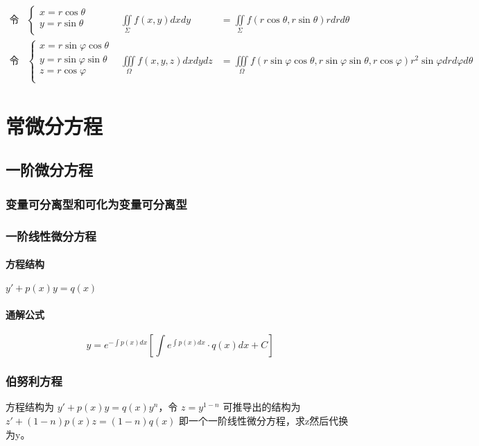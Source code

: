 ﻿\documentclass[a4paper,12pt,UTF8]{ctexart}
\begin{document}
    \begin{align*}
        \text{令}&
        \begin{cases}
            x=r \cos \theta\\
            y=r \sin \theta\\
        \end{cases}&
        \iint \limits_{\Sigma } f(x,y)dxdy& = \iint \limits_{\Sigma } f(r \cos \theta,r \sin \theta) rdrd\theta&\\
        \text{令}&
        \begin{cases}
            x=r \sin \varphi \cos \theta \\
            y=r \sin \varphi \sin \theta \\
            z=r \cos \varphi \\
        \end{cases}&
        \iiint \limits_{\Omega} f(x,y,z)dxdydz& = \iiint \limits_{\Omega} f(r \sin \varphi \cos \theta,r \sin \varphi \sin \theta,r \cos \varphi )r^2 \sin \varphi dr d\varphi d\theta&
    \end{align*}

    \section{常微分方程}
    
    \subsection{一阶微分方程}

    \subsubsection{变量可分离型和可化为变量可分离型}

    \subsubsection{一阶线性微分方程}
    \paragraph{方程结构}\(y'+p(x)y=q(x)\)
    \paragraph{通解公式}
    \[y=e^{-\int p(x)dx}\left[\int e^{\int p(x)dx} \cdot q(x)dx+C\right]\]

    \subsubsection{伯努利方程}
    方程结构为 \(y'+p(x)y=q(x)y^{n}\)，令 \(z=y^{1-n}\) 可推导出的结构为 \(z'+(1-n)p(x)z=(1-n)q(x)\) 即一个一阶线性微分方程，求z然后代换为y。
    
\end{document}
